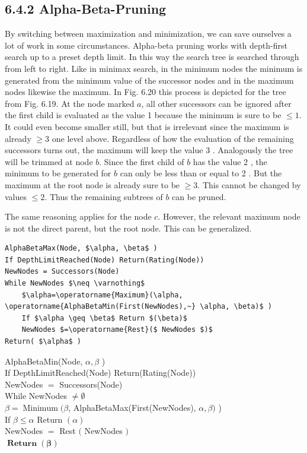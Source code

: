 \documentclass[10pt]{book}
\begin{document}
\begin{center}
\begin{enumerate}
\subsection*{6.4.2 Alpha-Beta-Pruning}
By switching between maximization and minimization, we can save ourselves a lot of work in some circumstances. Alpha-beta pruning works with depth-first search up to a preset depth limit. In this way the search tree is searched through from left to right. Like in minimax search, in the minimum nodes the minimum is generated from the minimum value of the successor nodes and in the maximum nodes likewise the maximum. In Fig. 6.20 this process is depicted for the tree from Fig. 6.19. At the node marked $a$, all other successors can be ignored after the first child is evaluated as the value 1 because the minimum is sure to be $\leq 1$. It could even become smaller still, but that is irrelevant since the maximum is already $\geq 3$ one level above. Regardless of how the evaluation of the remaining successors turns out, the maximum will keep the value 3 . Analogously the tree will be trimmed at node $b$. Since the first child of $b$ has the value 2 , the minimum to be generated for $b$ can only be less than or equal to 2 . But the maximum at the root node is already sure to be $\geq 3$. This cannot be changed by values $\leq 2$. Thus the remaining subtrees of $b$ can be pruned.


The same reasoning applies for the node $c$. However, the relevant maximum node is not the direct parent, but the root node. This can be generalized.

\begin{verbatim}
AlphaBetaMax(Node, $\alpha, \beta$ )
If DepthLimitReached(Node) Return(Rating(Node))
NewNodes = Successors(Node)
While NewNodes $\neq \varnothing$
    $\alpha=\operatorname{Maximum}(\alpha, \operatorname{AlphaBetaMin(First(NewNodes),~} \alpha, \beta)$ )
    If $\alpha \geq \beta$ Return $(\beta)$
    NewNodes $=\operatorname{Rest}($ NewNodes $)$
Return( $\alpha$ )
\end{verbatim}

AlphaBetaMin(Node, $\alpha, \beta$ )\\
If DepthLimitReached(Node) Return(Rating(Node))\\
NewNodes $=$ Successors(Node)\\
While NewNodes $\neq \emptyset$\\
$\beta=\operatorname{Minimum}(\beta$, AlphaBetaMax(First(NewNodes), $\alpha, \beta)$ )\\
If $\beta \leq \alpha$ Return $(\alpha)$\\
NewNodes $=$ Rest $($ NewNodes $)$\\
$\boldsymbol{\operatorname { R e t u r n }}(\boldsymbol{\beta})$


\end{enumerate}
\end{center}
\end{document}
